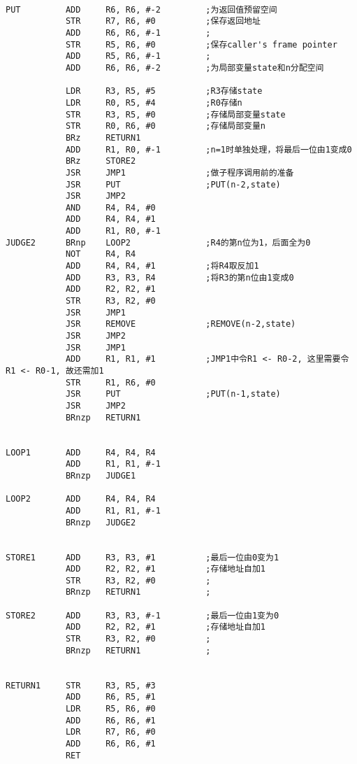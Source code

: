 \documentclass{article}
\begin{document}
\begin{lstlisting}
            
PUT         ADD     R6, R6, #-2         ;为返回值预留空间
            STR     R7, R6, #0          ;保存返回地址
            ADD     R6, R6, #-1         ;
            STR     R5, R6, #0          ;保存caller's frame pointer
            ADD     R5, R6, #-1         ;
            ADD     R6, R6, #-2         ;为局部变量state和n分配空间
            
            LDR     R3, R5, #5          ;R3存储state
            LDR     R0, R5, #4          ;R0存储n
            STR     R3, R5, #0          ;存储局部变量state
            STR     R0, R6, #0          ;存储局部变量n
            BRz     RETURN1             
            ADD     R1, R0, #-1         ;n=1时单独处理，将最后一位由1变成0
            BRz     STORE2
            JSR     JMP1                ;做子程序调用前的准备
            JSR     PUT                 ;PUT(n-2,state)
            JSR     JMP2
            AND     R4, R4, #0
            ADD     R4, R4, #1
            ADD     R1, R0, #-1
JUDGE2      BRnp    LOOP2               ;R4的第n位为1，后面全为0
            NOT     R4, R4
            ADD     R4, R4, #1          ;将R4取反加1
            ADD     R3, R3, R4          ;将R3的第n位由1变成0
            ADD     R2, R2, #1
            STR     R3, R2, #0
            JSR     JMP1
            JSR     REMOVE              ;REMOVE(n-2,state)
            JSR     JMP2
            JSR     JMP1
            ADD     R1, R1, #1          ;JMP1中令R1 <- R0-2, 这里需要令R1 <- R0-1, 故还需加1
            STR     R1, R6, #0
            JSR     PUT                 ;PUT(n-1,state)
            JSR     JMP2
            BRnzp   RETURN1 
               
            
LOOP1       ADD     R4, R4, R4
            ADD     R1, R1, #-1
            BRnzp   JUDGE1
            
LOOP2       ADD     R4, R4, R4
            ADD     R1, R1, #-1
            BRnzp   JUDGE2
              
            
STORE1      ADD     R3, R3, #1          ;最后一位由0变为1
            ADD     R2, R2, #1          ;存储地址自加1
            STR     R3, R2, #0          ;
            BRnzp   RETURN1             ;
            
STORE2      ADD     R3, R3, #-1         ;最后一位由1变为0
            ADD     R2, R2, #1          ;存储地址自加1
            STR     R3, R2, #0          ;
            BRnzp   RETURN1             ;
            
            
RETURN1     STR     R3, R5, #3
            ADD     R6, R5, #1
            LDR     R5, R6, #0
            ADD     R6, R6, #1
            LDR     R7, R6, #0
            ADD     R6, R6, #1
            RET
            

\end{lstlisting}
\end{document}
